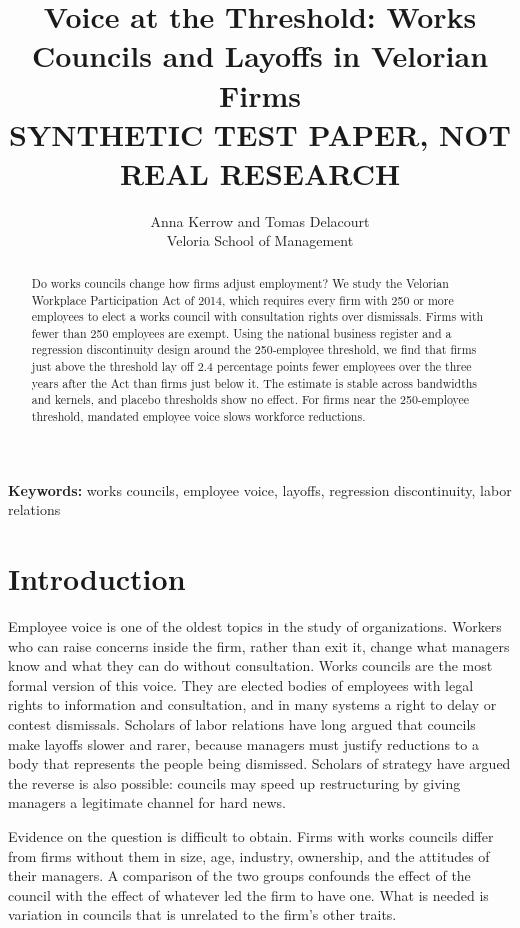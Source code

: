 \documentclass[12pt]{article}
\title{Voice at the Threshold: Works Councils and Layoffs in Velorian Firms\\[1ex]
\large\textbf{SYNTHETIC TEST PAPER, NOT REAL RESEARCH}}
\author{Anna Kerrow and Tomas Delacourt\\ Veloria School of Management}
\date{}
\begin{document}
\maketitle

\begin{abstract}
\noindent Do works councils change how firms adjust employment? We study the Velorian Workplace Participation Act of 2014, which requires every firm with 250 or more employees to elect a works council with consultation rights over dismissals. Firms with fewer than 250 employees are exempt. Using the national business register and a regression discontinuity design around the 250-employee threshold, we find that firms just above the threshold lay off 2.4 percentage points fewer employees over the three years after the Act than firms just below it. The estimate is stable across bandwidths and kernels, and placebo thresholds show no effect. For firms near the 250-employee threshold, mandated employee voice slows workforce reductions.
\end{abstract}

\noindent\textbf{Keywords:} works councils, employee voice, layoffs, regression discontinuity, labor relations

\newpage

\section{Introduction}

Employee voice is one of the oldest topics in the study of organizations. Workers who can raise concerns inside the firm, rather than exit it, change what managers know and what they can do without consultation. Works councils are the most formal version of this voice. They are elected bodies of employees with legal rights to information and consultation, and in many systems a right to delay or contest dismissals. Scholars of labor relations have long argued that councils make layoffs slower and rarer, because managers must justify reductions to a body that represents the people being dismissed. Scholars of strategy have argued the reverse is also possible: councils may speed up restructuring by giving managers a legitimate channel for hard news.

Evidence on the question is difficult to obtain. Firms with works councils differ from firms without them in size, age, industry, ownership, and the attitudes of their managers. A comparison of the two groups confounds the effect of the council with the effect of whatever led the firm to have one. What is needed is variation in councils that is unrelated to the firm's other traits.
\end{document}
